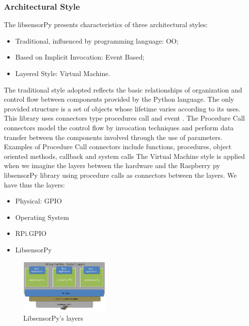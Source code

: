 \documentclass{acm_proc_article-sp}
\begin{document}
\subsubsection{Architectural Style}
The libsensorPy presents characteristics of three architectural styles: 
\begin{itemize}
\item Traditional, influenced by programming language: OO;
\item Based on Implicit Invocation: Event Based; 
\item Layered Style: Virtual Machine.
\end{itemize}

The traditional style adopted reflects the basic relationships of organization and control flow between components provided by the Python language. The only provided structure is a set of objects whose lifetime varies according to its uses. This library uses connectors type procedures call and event . The Procedure Call connectors model the control flow by invocation techniques and perform data transfer between the components involved through the use of parameters. Examples of Procedure Call connectors include functions, procedures,  object oriented methods, callback and system calls
\newline
\newline
The Virtual Machine style is applied when we imagine the layers between the hardware and the Raspberry py libsensorPy library using procedure calls as connectors between the layers. We have thus the layers:
\begin{itemize}
\item Physical: GPIO
\item Operating System
\item RPi.GPIO
\item LibsensorPy
\end{itemize}

\begin{figure}[h]
    \includegraphics[width=0.4\textwidth,natwidth=610,natheight=642]{pictures/machinelayers.png}
    \caption{LibsensorPy's layers}
    \label{fig:layers}
\end{figure}
\end{document}
